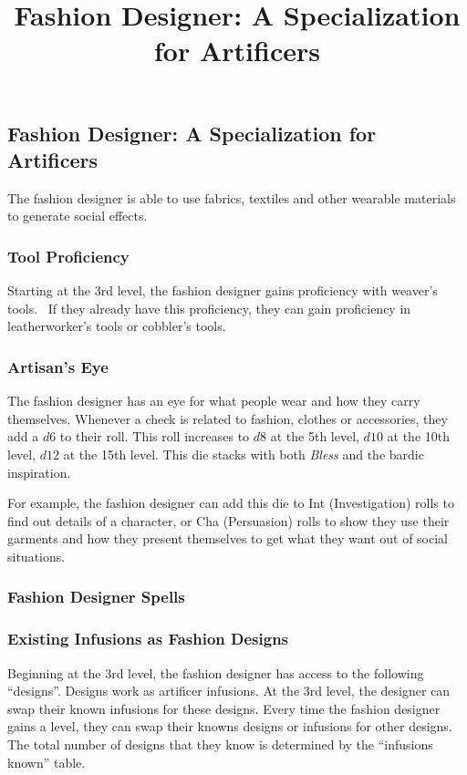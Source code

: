 \documentclass[twocolumn]{dndbook}
\begin{document}
\title{Fashion Designer: A Specialization for Artificers}

\subsection{Fashion Designer: A Specialization for Artificers}

The fashion designer is able to use fabrics, textiles and other wearable materials to generate social effects.

\subsubsection{Tool Proficiency}

Starting at the 3rd level, the fashion designer gains proficiency with weaver's tools.\
If they already have this proficiency, they can gain proficiency in leatherworker's tools or cobbler's tools.

\subsubsection{Artisan's Eye}
The fashion designer has an eye for what people wear and how they carry themselves.
Whenever a check is related to fashion, clothes or accessories, they add a $d6$ to their roll.
This roll increases to $d8$ at the 5th level, $d10$ at the 10th level, $d12$ at the 15th level.
This die stacks with both \emph{Bless} and the bardic inspiration.\par

For example, the fashion designer can add this die to Int (Investigation) rolls to find out details of a character,
or Cha (Persuasion) rolls to show they use their garments and how they present themselves to get what they want out of social situations.\par

\subsubsection{Fashion Designer Spells}


\subsubsection{Existing Infusions as Fashion Designs}

Beginning at the 3rd level, the fashion designer has access to the following ``designs''.
Designs work as artificer infusions.
At the 3rd level, the designer can swap their known infusions for these designs.
Every time the fashion designer gains a level, they can swap their knowns designs or infusions for other designs.
The total number of designs that they know is determined by the ``infusions known'' table.\par
\end{document}
